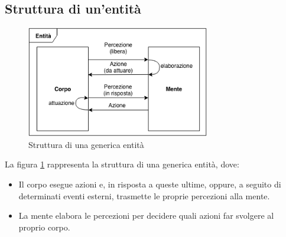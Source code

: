 \subsection{Struttura di un'entità} \label{struttura_entita1}

\begin{figure}[H]
   \centering
   \includegraphics[width=8cm]{figures/Entita_struttura.png}
   \caption{Struttura di una generica entità}
   \label{entita_struttura}
\end{figure}

La figura \ref{entita_struttura} rappresenta la struttura di una generica entità, dove:

\begin{itemize}
   \item Il corpo esegue azioni e, in risposta a queste ultime, oppure, a seguito di determinati eventi esterni, trasmette le proprie percezioni alla mente.
   \item La mente elabora le percezioni per decidere quali azioni far svolgere al proprio corpo.
\end{itemize}


